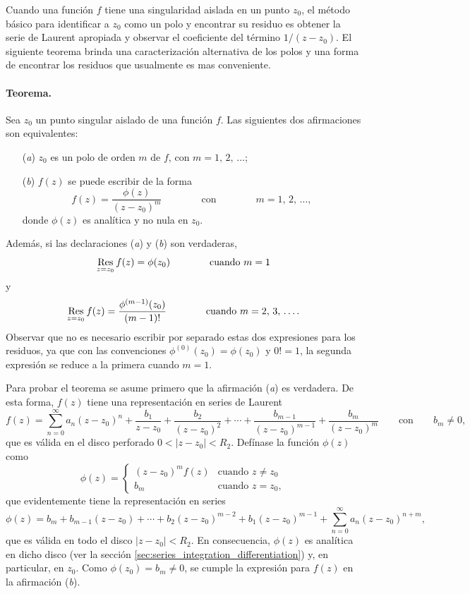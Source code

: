 \documentclass[a4paper]{report}
\def\Res{\qopname\relax m{Res}}
\begin{document}
Cuando una función \(f\) tiene una singularidad aislada en un punto \(z_0\), el método básico para identificar a \(z_0\) como un polo y encontrar su residuo es obtener la serie de Laurent apropiada y observar el coeficiente del término \(1/(z-z_0)\). El siguiente teorema brinda una caracterización alternativa de los polos y una forma de encontrar los residuos que usualmente es mas conveniente. 

\paragraph{Teorema.} Sea \(z_0\) un punto singular aislado de una función \(f\). Las siguientes dos afirmaciones son equivalentes:
\begin{enumerate}
 \item[(\textit{a})] \(z_0\) es un polo de orden \(m\) de \(f\), con \(m=1,\,2,\,\dots\);
 \item[(\textit{b})] \(f(z)\) se puede escribir de la forma 
 \[
  f(z)=\frac{\phi(z)}{(z-z_0)^m}
  \qquad\qquad\textrm{con}\qquad\qquad
  m=1,\,2,\,\dots,
 \]
 donde \(\phi(z)\) es analítica y no nula en \(z_0\).
\end{enumerate}
Además, si las declaraciones (\textit{a}) y (\textit{b}) son verdaderas,
\[
 \Res_{z=z_0}f(z)=\phi(z_0)
 \qquad\qquad\textrm{cuando }m=1
\]
y
\begin{equation}\label{eq:residues_at_poles_phi}
 \Res_{z=z_0}f(z)=\frac{\phi^{(m-1)}(z_0)}{(m-1)!}
 \qquad\qquad\textrm{cuando }m=2,\,3,\,\dots.
\end{equation}
Observar que no es necesario escribir por separado estas dos expresiones para los residuos, ya que con las convenciones \(\phi^{(0)}(z_0)=\phi(z_0)\) y \(0!=1\), la segunda expresión se reduce a la primera cuando \(m=1\). 

Para probar el teorema se asume primero que la afirmación (\textit{a}) es verdadera. De esta forma, \(f(z)\) tiene una representación en series de Laurent 
\[
 f(z)=\sum_{n=0}^\infty a_n(z-z_0)^n+\frac{b_1}{z-z_0}+\frac{b_2}{(z-z_0)^2}+\cdots+\frac{b_{m-1}}{(z-z_0)^{m-1}}+\frac{b_m}{(z-z_0)^m}
 \qquad\textrm{con}\qquad
 b_m\neq0,
\]
que es válida en el disco perforado \(0<|z-z_0|<R_2\). Defínase la función \(\phi(z)\) como
\[
 \phi(z)=
 \left\{ 
 \begin{array}{ll}
  (z-z_0)^mf(z) & \textrm{cuando }z\neq z_0\\
  b_m & \textrm{cuando }z=z_0,
 \end{array}
 \right.
\]
que evidentemente tiene la representación en series 
\[
 \phi(z)=b_m+b_{m-1}(z-z_0)+\cdots+b_2(z-z_0)^{m-2}+b_1(z-z_0)^{m-1}+\sum_{n=0}^\infty a_n(z-z_0)^{n+m},
\]
que es válida en todo el disco \(|z-z_0|<R_2\). En consecuencia, \(\phi(z)\) es analítica en dicho disco (ver la sección \ref{sec:series_integration_differentiation}) y, en particular, en \(z_0\). Como \(\phi(z_0)=b_m\neq0\), se cumple la expresión para \(f(z)\) en la afirmación (\textit{b}).  
\end{document}
